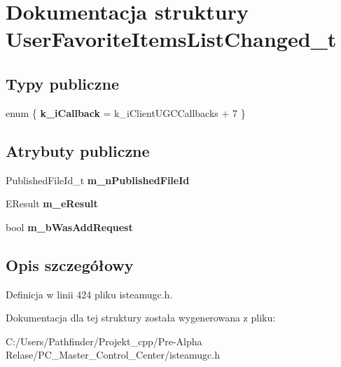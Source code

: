 \hypertarget{struct_user_favorite_items_list_changed__t}{}\section{Dokumentacja struktury User\+Favorite\+Items\+List\+Changed\+\_\+t}
\label{struct_user_favorite_items_list_changed__t}
\subsection*{Typy publiczne}
\begin{DoxyCompactItemize}
\item 
\mbox{\label{struct_user_favorite_items_list_changed__t_a5ac2478b61afcc88717975c5c98b7ad6}} 
enum \{ {\bfseries k\+\_\+i\+Callback} = k\+\_\+i\+Client\+U\+G\+C\+Callbacks + 7
 \}
\end{DoxyCompactItemize}
\subsection*{Atrybuty publiczne}
\begin{DoxyCompactItemize}
\item 
\mbox{\label{struct_user_favorite_items_list_changed__t_aa74ebdf8ce73a9fe84d49e9393314e3d}} 
Published\+File\+Id\+\_\+t {\bfseries m\+\_\+n\+Published\+File\+Id}
\item 
\mbox{\label{struct_user_favorite_items_list_changed__t_a46e7b5f2b49077a3f42f5a6a6f3b183b}} 
E\+Result {\bfseries m\+\_\+e\+Result}
\item 
\mbox{\label{struct_user_favorite_items_list_changed__t_a91f0bc429548edf539c357c467ffb8f3}} 
bool {\bfseries m\+\_\+b\+Was\+Add\+Request}
\end{DoxyCompactItemize}


\subsection{Opis szczegółowy}


Definicja w linii 424 pliku isteamugc.\+h.



Dokumentacja dla tej struktury została wygenerowana z pliku\+:\begin{DoxyCompactItemize}
\item 
C\+:/\+Users/\+Pathfinder/\+Projekt\+\_\+cpp/\+Pre-\/\+Alpha Relase/\+P\+C\+\_\+\+Master\+\_\+\+Control\+\_\+\+Center/isteamugc.\+h\end{DoxyCompactItemize}
